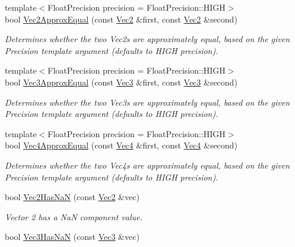 \begin{DoxyCompactItemize}
{\footnotesize template$<$Float\+Precision precision = Float\+Precision\+::\+H\+I\+G\+H$>$ }\\bool \hyperlink{group___s_i_s_d_vec_math_gae2e5df24e56917013fefa17579bb8749}{Vec2\+Approx\+Equal} (const \hyperlink{classgfxmath_1_1_vec2}{Vec2} \&first, const \hyperlink{classgfxmath_1_1_vec2}{Vec2} \&second)
\begin{DoxyCompactList}\small\item\em Determines whether the two Vec2s are approximately equal, based on the given Precision template argument (defaults to H\+I\+G\+H precision). \end{DoxyCompactList}\item 
{\footnotesize template$<$Float\+Precision precision = Float\+Precision\+::\+H\+I\+G\+H$>$ }\\bool \hyperlink{group___s_i_s_d_vec_math_gac042c4407bfaa66715e3c4b5b0a839f4}{Vec3\+Approx\+Equal} (const \hyperlink{classgfxmath_1_1_vec3}{Vec3} \&first, const \hyperlink{classgfxmath_1_1_vec3}{Vec3} \&second)
\begin{DoxyCompactList}\small\item\em Determines whether the two Vec3s are approximately equal, based on the given Precision template argument (defaults to H\+I\+G\+H precision). \end{DoxyCompactList}\item 
{\footnotesize template$<$Float\+Precision precision = Float\+Precision\+::\+H\+I\+G\+H$>$ }\\bool \hyperlink{group___s_i_s_d_vec_math_ga819b8c958e12f0838288c641af7e1ab6}{Vec4\+Approx\+Equal} (const \hyperlink{classgfxmath_1_1_vec4}{Vec4} \&first, const \hyperlink{classgfxmath_1_1_vec4}{Vec4} \&second)
\begin{DoxyCompactList}\small\item\em Determines whether the two Vec4s are approximately equal, based on the given Precision template argument (defaults to H\+I\+G\+H precision). \end{DoxyCompactList}\item 
bool \hyperlink{group___s_i_s_d_vec_math_ga7b340b1e4dd88d99aba27f41cd0c1d17}{Vec2\+Has\+Na\+N} (const \hyperlink{classgfxmath_1_1_vec2}{Vec2} \&vec)
\begin{DoxyCompactList}\small\item\em Vector 2 has a Na\+N component value. \end{DoxyCompactList}\item 
bool \hyperlink{group___s_i_s_d_vec_math_ga5d19e3d1ee15741a65ede16f20e919a4}{Vec3\+Has\+Na\+N} (const \hyperlink{classgfxmath_1_1_vec3}{Vec3} \&vec)

\end{DoxyCompactItemize}
